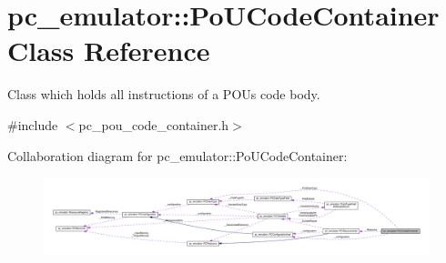 \hypertarget{classpc__emulator_1_1PoUCodeContainer}{}\section{pc\+\_\+emulator\+:\+:Po\+U\+Code\+Container Class Reference}
\label{classpc__emulator_1_1PoUCodeContainer}


Class which holds all instructions of a P\+OU\textquotesingle{}s code body.  




{\ttfamily \#include $<$pc\+\_\+pou\+\_\+code\+\_\+container.\+h$>$}



Collaboration diagram for pc\+\_\+emulator\+:\+:Po\+U\+Code\+Container\+:
\nopagebreak
\begin{figure}[H]
\begin{center}
\leavevmode
\includegraphics[width=350pt]{classpc__emulator_1_1PoUCodeContainer__coll__graph}
\end{center}
\end{figure}
